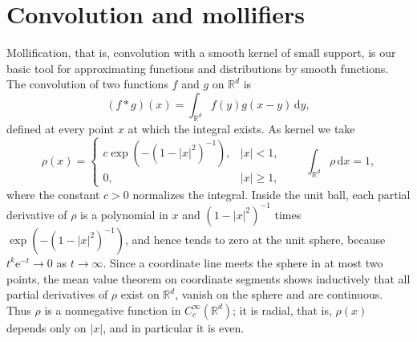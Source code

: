 \section{Convolution and mollifiers}
\label{sec:convolution}
Mollification, that is, convolution with a smooth kernel of small support, is our basic tool for approximating functions and distributions by smooth functions. The convolution of two functions $f$ and $g$ on $\mathbb R^d$ is
\[
 (f*g)(x)=\int_{\mathbb R^d}f(y)g(x-y)\,\mathrm dy,
\]
defined at every point $x$ at which the integral exists. As kernel we take
\[
 \rho(x)=\begin{cases}c\exp(-(1-|x|^2)^{-1}),&|x|<1,\\0,&|x|\geq1,\end{cases}
 \qquad \int_{\mathbb R^d}\rho\,\mathrm d x=1,
\]
where the constant $c>0$ normalizes the integral. Inside the unit ball, each partial derivative of $\rho$ is a polynomial in $x$ and $(1-|x|^2)^{-1}$ times $\exp(-(1-|x|^2)^{-1})$, and hence tends to zero at the unit sphere, because $t^k\mathrm e^{-t}\to0$ as $t\to\infty$. Since a coordinate line meets the sphere in at most two points, the mean value theorem on coordinate segments shows inductively that all partial derivatives of $\rho$ exist on $\mathbb R^d$, vanish on the sphere and are continuous. Thus $\rho$ is a nonnegative function in $C_c^\infty(\mathbb R^d)$; it is radial, that is, $\rho(x)$ depends only on $|x|$, and in particular it is even.

